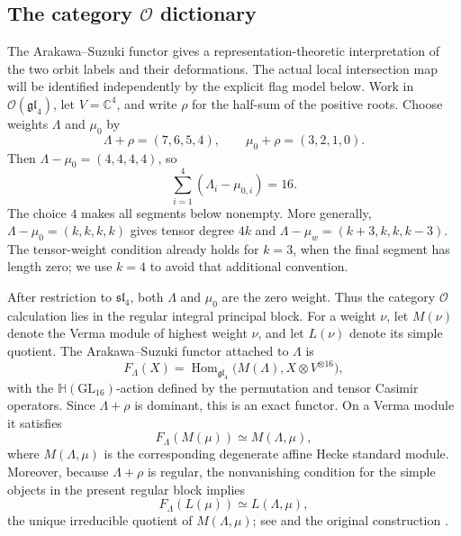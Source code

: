 \documentclass[10pt,a4paper]{amsart}
\newcommand{\Hh}{\mathbb H}
\begin{document}

\subsection{The category \texorpdfstring{$\mathcal O$}{O} dictionary}

The Arakawa--Suzuki functor gives a representation-theoretic
interpretation of the two orbit labels and their deformations.
The actual local intersection map will be identified independently by
the explicit flag model below.
Work in $\mathcal O(\mathfrak{gl}_4)$, let
$V=\mathbb C^4$, and write $\rho$ for the half-sum of the positive roots.
Choose weights $\Lambda$ and $\mu_0$ by
\begin{equation}\label{eq:appendix-AS-weights}
 \Lambda+\rho=(7,6,5,4),
 \qquad
 \mu_0+\rho=(3,2,1,0).
\end{equation}
Then $\Lambda-\mu_0=(4,4,4,4)$, so
\[
 \sum_{i=1}^4(\Lambda_i-\mu_{0,i})=16.
\]
The choice $4$ makes all segments below nonempty.  More generally,
$\Lambda-\mu_0=(k,k,k,k)$ gives tensor degree $4k$ and
$\Lambda-\mu_w=(k+3,k,k,k-3)$.  The tensor-weight condition already
holds for $k=3$, when the final segment has length zero; we use $k=4$
to avoid that additional convention.

After restriction to $\mathfrak{sl}_4$, both $\Lambda$ and $\mu_0$ are the
zero weight.  Thus the category $\mathcal O$ calculation lies in the regular
integral principal block. %
 For a weight $\nu$, let $M(\nu)$ denote the Verma module of highest weight
$\nu$, and let $L(\nu)$ denote its simple quotient.  The Arakawa--Suzuki
functor attached to $\Lambda$ is
\[
 F_\Lambda(X)=
 \operatorname{Hom}_{\mathfrak{gl}_4}
 \bigl(M(\Lambda),X\otimes V^{\otimes16}\bigr),
\]
with the $\Hh(\mathrm{GL}_{16})$-action defined by the permutation and tensor
Casimir operators.  Since $\Lambda+\rho$ is dominant, this is an exact
functor.  On a Verma module it satisfies
\begin{equation}\label{eq:appendix-AS-standard}
 F_\Lambda(M(\mu))\simeq M(\Lambda,\mu),
\end{equation}
where $M(\Lambda,\mu)$ is the corresponding degenerate affine Hecke
standard module.  Moreover, because $\Lambda+\rho$ is regular, the
nonvanishing condition for the simple objects in the present regular block
implies
\begin{equation}\label{eq:appendix-AS-simple}
 F_\Lambda(L(\mu))\simeq L(\Lambda,\mu),
\end{equation}
the unique irreducible quotient of $M(\Lambda,\mu)$; see
\cite[Sections~2.2 and~3.1--3.2]{Suzuki} and the original construction
\cite{ArakawaSuzuki}.
\end{document}
